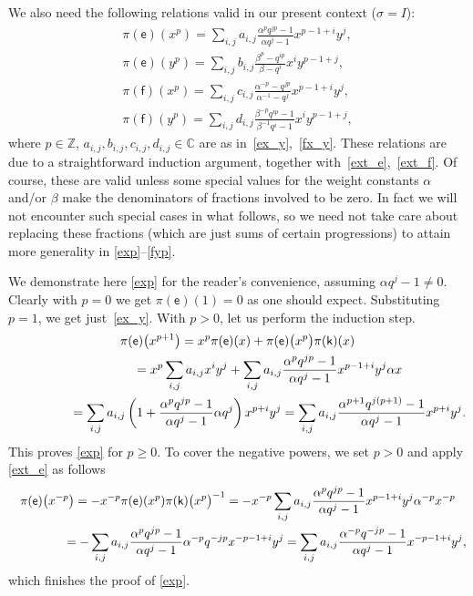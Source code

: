 \documentclass[pdftex]{sigma}
\numberwithin{equation}{section}
\begin{document}
We also need the following relations valid in our present context ($\sigma=I$):
\begin{gather}
\pi(\mathsf{e})(x^p)=\sum_{i,j}a_{i,j}\frac{\alpha^pq^{jp}-1}{\alpha q^j-1}x^{p-1+i}y^j, \label{exp}\\
\pi(\mathsf{e})(y^p)=\sum_{i,j}b_{i,j}\frac{\beta^p-q^{ip}}{\beta-q^i}x^iy^{p-1+j}, \label{eyp}\\
\pi(\mathsf{f})(x^p)=\sum_{i,j}c_{i,j}\frac{\alpha^{-p}-q^{jp}}{\alpha^{-1}-q^j}x^{p-1+i}y^j, \label{fxp}\\
\pi(\mathsf{f})(y^p)=\sum_{i,j}d_{i,j}\frac{\beta^{-p}q^{ip}-1}{\beta^{-1}q^i-1}x^iy^{p-1+j}, \label{fyp}
\end{gather}
where $p\in\mathbb{Z}$, $a_{i,j},b_{i,j},c_{i,j},d_{i,j}\in\mathbb{C}$ are as in~\eqref{ex_y},~\eqref{fx_y}. These relations are due to a straightforward induction argument, together with~\eqref{ext_e},~\eqref{ext_f}. Of course, these are valid unless some special values for the weight constants $\alpha$ and/or $\beta$ make the denominators of fractions involved to be zero. In fact we will not encounter such special cases in what follows, so we need not take care about replacing these fractions (which are just sums of certain progressions) to attain more generality in \eqref{exp}--\eqref{fyp}.

We demonstrate here \eqref{exp} for the reader's convenience, assuming $\alpha q^j-1\ne 0$. Clearly with $p=0$ we get $\pi(\mathsf{e})(1)=0$ as one should expect. Substituting $p=1$, we get just~\eqref{ex_y}. With $p>0$, let us perform the induction step.
\begin{gather*}
\pi(\mathsf{e})\big(x^{p+1}\big)= x^p\pi(\mathsf{e})(x)+\pi(\mathsf{e})\big(x^p\big)\pi(\mathsf{k})(x)\\
\hphantom{\pi(\mathsf{e})\big(x^{p+1}\big)}{} =x^p\sum_{i,j}a_{i,j}x^iy^j+\sum_{i,j}a_{i,j}\frac{\alpha^pq^{jp}-1}{\alpha q^j-1}x^{p-1+i}y^j\alpha x\\
\hphantom{\pi(\mathsf{e})\big(x^{p+1}\big)}{} =\sum_{i,j}a_{i,j}\left(1+\frac{\alpha^pq^{jp}-1}{\alpha q^j-1}\alpha q^j\right)x^{p+i}y^j=\sum_{i,j}a_{i,j}\frac{\alpha^{p+1}q^{j(p+1)}-1}{\alpha q^j-1}x^{p+i}y^j.
\end{gather*}
This proves \eqref{exp} for $p\ge 0$. To cover the negative powers, we set $p>0$ and apply \eqref{ext_e} as follows
\begin{gather*}
\pi(\mathsf{e})\big(x^{-p}\big)= -x^{-p}\pi(\mathsf{e})(x^p)\pi(\mathsf{k})\big(x^p\big)^{-1}=
-x^{-p}\sum_{i,j}a_{i,j}\frac{\alpha^pq^{jp}-1}{\alpha q^j-1}x^{p-1+i}y^j\alpha^{-p}x^{-p}\\
\hphantom{\pi(\mathsf{e})\big(x^{-p}\big)}{} =-\sum_{i,j}a_{i,j}\frac{\alpha^pq^{jp}-1}{\alpha q^j-1}\alpha^{-p}q^{-jp}x^{-p-1+i}y^j=
\sum_{i,j}a_{i,j}\frac{\alpha^{-p}q^{-jp}-1}{\alpha q^j-1}x^{-p-1+i}y^j,
\end{gather*}
which finishes the proof of \eqref{exp}.
\end{document}
